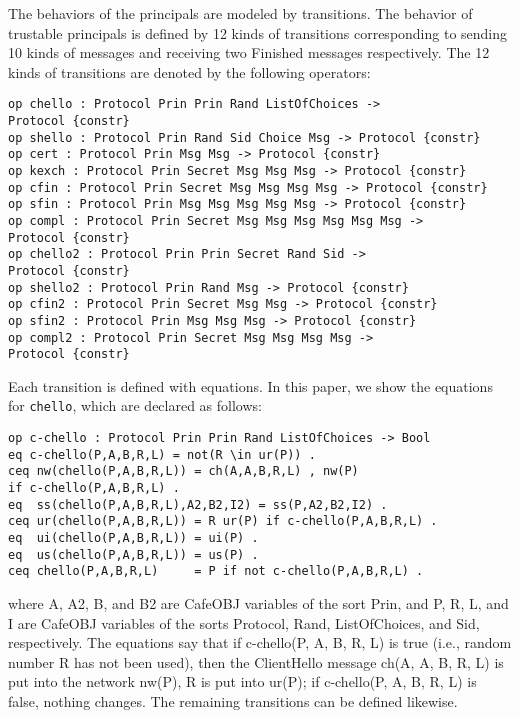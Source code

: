 \documentclass[a4paper,fleqn]{cas-dc}
\begin{document}
The behaviors of the principals are modeled by transitions. The behavior of trustable principals is defined by 12 kinds of transitions corresponding to sending 10 kinds of messages and receiving two Finished messages respectively.
The 12 kinds of transitions are denoted by the following operators:
\begin{small}
\begin{verbatim}
op chello : Protocol Prin Prin Rand ListOfChoices ->
Protocol {constr}
op shello : Protocol Prin Rand Sid Choice Msg -> Protocol {constr}
op cert : Protocol Prin Msg Msg -> Protocol {constr}
op kexch : Protocol Prin Secret Msg Msg Msg -> Protocol {constr}
op cfin : Protocol Prin Secret Msg Msg Msg Msg -> Protocol {constr}
op sfin : Protocol Prin Msg Msg Msg Msg Msg -> Protocol {constr}
op compl : Protocol Prin Secret Msg Msg Msg Msg Msg Msg ->
Protocol {constr}
op chello2 : Protocol Prin Prin Secret Rand Sid -> 
Protocol {constr}
op shello2 : Protocol Prin Rand Msg -> Protocol {constr}
op cfin2 : Protocol Prin Secret Msg Msg -> Protocol {constr}
op sfin2 : Protocol Prin Msg Msg Msg -> Protocol {constr}
op compl2 : Protocol Prin Secret Msg Msg Msg Msg -> 
Protocol {constr} 
\end{verbatim}
\end{small}	
Each transition is defined with equations.
In this paper, we show the equations for \verb!chello!, which are declared as follows:
\begin{small}
\begin{verbatim}
op c-chello : Protocol Prin Prin Rand ListOfChoices -> Bool
eq c-chello(P,A,B,R,L) = not(R \in ur(P)) .
ceq nw(chello(P,A,B,R,L)) = ch(A,A,B,R,L) , nw(P) 
if c-chello(P,A,B,R,L) .
eq  ss(chello(P,A,B,R,L),A2,B2,I2) = ss(P,A2,B2,I2) .
ceq ur(chello(P,A,B,R,L)) = R ur(P) if c-chello(P,A,B,R,L) .
eq  ui(chello(P,A,B,R,L)) = ui(P) .
eq  us(chello(P,A,B,R,L)) = us(P) .
ceq chello(P,A,B,R,L)     = P if not c-chello(P,A,B,R,L) . 
\end{verbatim}
\end{small}	
where A, A2, B, and B2 are CafeOBJ variables of the sort Prin, and P, R, L, and I are CafeOBJ variables of the sorts Protocol, Rand, ListOfChoices, and Sid, respectively.
The  equations  say  that  if c-chello(P, A, B, R, L) is  true
(i.e., random number R has   not   been   used), then the ClientHello message ch(A, A, B, R, L) is put into the network nw(P), R is put into ur(P); if c-chello(P, A, B, R, L) is  false,  nothing  changes.  The remaining transitions can be defined likewise.
\end{document}
